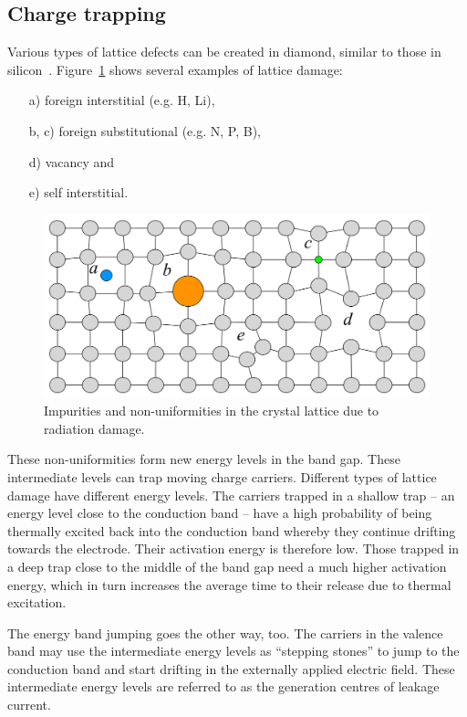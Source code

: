 \subsection{Charge trapping}
Various types of lattice defects can be created in diamond, similar to those in silicon~\cite{CHTR:00000}.
Figure~\ref{fig:raddamage} shows several examples of lattice damage:
\begin{enumerate}
\item[a)]foreign interstitial (e.g. H, Li),
\item[b, c)]foreign substitutional (e.g. N, P, B),
\item[d)]vacancy and
\item[e)]self interstitial.
\end{enumerate}
\begin{figure}[!t]
\begin{center}
\includegraphics[width=0.55\linewidth]{02_pulse_formation/pics/plots/raddamage}
\caption{Impurities and non-uniformities in the crystal lattice due to radiation damage.}
\label{fig:raddamage}
\end{center}
\end{figure} 
These non-uniformities form new energy levels in the band gap. These intermediate levels can trap moving charge carriers. %
Different types of lattice damage have different energy levels. The carriers trapped in a shallow trap -- an energy level close to the conduction band -- have a high probability of being thermally excited back into the conduction band whereby they continue drifting towards the electrode. Their activation energy is therefore low. Those trapped in a deep trap close to the middle of the band gap need a much higher activation energy, which in turn increases the average time to their release due to thermal excitation.

The energy band jumping goes the other way, too. The carriers in the valence band may use the intermediate energy levels as ``stepping stones'' to jump to the conduction band and start drifting in the externally applied electric field. These intermediate energy levels are referred to as the generation centres of leakage current.

